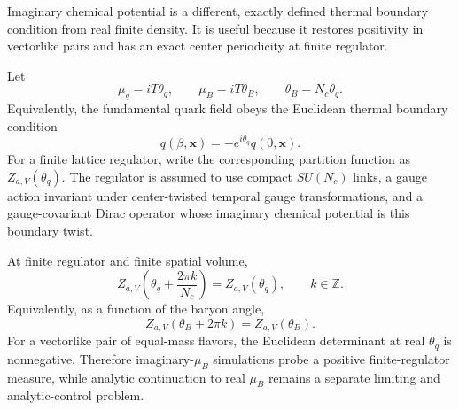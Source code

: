 Imaginary chemical potential is a different, exactly defined thermal boundary
condition from real finite density.  It is useful because it restores
positivity in vectorlike pairs and has an exact center
periodicity at finite regulator.

\begin{definition}
\label{def:qcd-imaginary-mu-angles}
Let
\[
  \mu_q=iT\theta_q,\qquad
  \mu_B=iT\theta_B,\qquad
  \theta_B=N_c\theta_q .
\]
Equivalently, the fundamental quark field obeys the Euclidean thermal
boundary condition
\[
  q(\beta,\mathbf x)=-e^{i\theta_q}q(0,\mathbf x).
\]
For a finite lattice regulator, write the corresponding partition function
as \(Z_{a,V}(\theta_q)\).  The regulator is assumed to use compact
\(SU(N_c)\) links, a gauge action invariant under center-twisted temporal
gauge transformations, and a gauge-covariant Dirac operator whose imaginary
chemical potential is this boundary twist.
\end{definition}

\begin{lemma}
\label{lem:qcd-roberge-weiss-periodicity}
At finite regulator and finite spatial volume,
\[
  Z_{a,V}\!\left(\theta_q+\frac{2\pi k}{N_c}\right)
  =
  Z_{a,V}(\theta_q),
  \qquad k\in\mathbb Z .
\]
Equivalently, as a function of the baryon angle,
\[
  Z_{a,V}(\theta_B+2\pi k)=Z_{a,V}(\theta_B).
\]
For a vectorlike pair of equal-mass flavors, the Euclidean determinant at
real \(\theta_q\) is nonnegative.  Therefore imaginary-\(\mu_B\) simulations
probe a positive finite-regulator measure, while analytic continuation to
real \(\mu_B\) remains a separate limiting and analytic-control problem.
\end{lemma}


